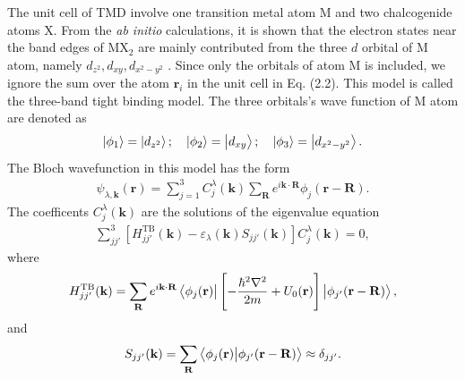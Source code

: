 \documentclass{report}
\newcommand{\f}[2]{\dfrac{#1}{#2}}
\begin{document}
The unit cell of \ac{TMD} involve one transition metal atom M and two chalcogenide atoms X. From the \textit{ab initio} calculations, it is shown that the electron states near the band edges of MX$_{2}$ are mainly contributed from the three $d$ orbital of M atom, namely $d_{z^{2}},d_{xy},d_{x^{2}-y^{2}}$ \cite{PhysRevB.88.085433}. Since only the orbitals of atom M is included, we ignore the sum over the atom $\mathbf{r}_{i}$ in the unit cell in Eq. (2.2). This model is called the three-band tight binding model. The three orbitals's wave function of M atom are denoted as
\begin{gather}
	\ket{\phi_{1}} = \ket{d_{z^{2}}} ; \quad \ket{\phi_{2}} = \ket{d_{xy}} ; \quad \ket{\phi_{3}} = \ket{d_{x^{2} - y^{2}}}.
\end{gather}
The Bloch wavefunction in this model has the form
\begin{gather}
	\psi_{\lambda,\mathbf{k}}(\mathbf{r}) = \sum_{j=1}^{3} C_{j}^{\lambda}(\mathbf{k}) \sum_{\mathbf{R}} e^{i \mathbf{k \cdot R}} \phi_{j}(\mathbf{r} - \mathbf{R}).
\end{gather}
The coefficents $C_{j}^{\lambda}(\mathbf{k})$ are the solutions of the eigenvalue equation
\begin{gather}
	\sum_{jj'}^{3} \left[H_{jj'}^{\text{TB}}(\mathbf{k}) - \varepsilon_{\lambda}(\mathbf{k}) S_{jj'}(\mathbf{k})\right] C_{j}^{\lambda}(\mathbf{k}) = 0,
\end{gather}
where
\begin{equation}
	\begin{aligned}
		H_{jj'}^{\text{TB}}(\mathbf{k}) = \sum_{\mathbf{R}} e^{i \mathbf{k \cdot R}} \bra{\phi_{j}(\mathbf{r})} \left[-\f{\hbar^{2} \nabla^{2}}{2m} + U_{0}(\mathbf{r})\right] \ket{\phi_{j'}(\mathbf{r - R})},
	\end{aligned}
\end{equation}
and
\begin{equation}
	\begin{aligned}
		S_{jj'}(\mathbf{k}) = \sum_{\mathbf{R}} \bra{\phi_{j}(\mathbf{r})} \ket{\phi_{j'}(\mathbf{r - R})} \approx \delta_{jj'}.
	\end{aligned}
\end{equation}
\end{document}
